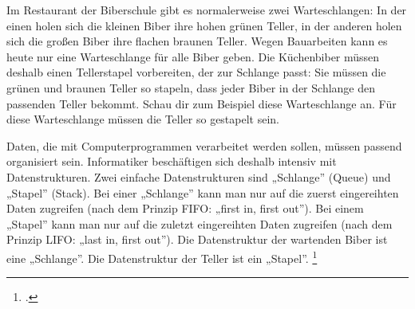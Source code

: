 \documentclass{lehramt-informatik-haupt}
\begin{document}
Im Restaurant der Biberschule gibt es normalerweise zwei Warteschlangen:
In der einen holen sich die kleinen Biber ihre hohen grünen Teller, in
der anderen holen sich die großen Biber ihre flachen braunen Teller.
Wegen Bauarbeiten kann es heute nur eine Warteschlange für alle Biber
geben. Die Küchenbiber müssen deshalb einen Tellerstapel vorbereiten,
der zur Schlange passt: Sie müssen die grünen und braunen Teller so
stapeln, dass jeder Biber in der Schlange den passenden Teller bekommt.
Schau dir zum Beispiel diese Warteschlange an. Für diese Warteschlange
müssen die Teller so gestapelt sein.

Daten, die mit Computerprogrammen verarbeitet werden sollen, müssen
passend organisiert sein. Informatiker beschäftigen sich deshalb
intensiv mit Datenstrukturen. Zwei einfache Datenstrukturen sind
„Schlange” (Queue) und „Stapel” (Stack). Bei einer „Schlange” kann man
nur auf die zuerst eingereihten Daten zugreifen (nach dem Prinzip FIFO:
„first in, first out”). Bei einem „Stapel” kann man nur auf die zuletzt
eingereihten Daten zugreifen (nach dem Prinzip LIFO: „last in, first
out”). Die Datenstruktur der wartenden Biber ist eine „Schlange”. Die
Datenstruktur der Teller ist ein „Stapel”.
\footcite[Seite 35]{net:pdf:informatik-biber-2010}

\literatur
\end{document}
